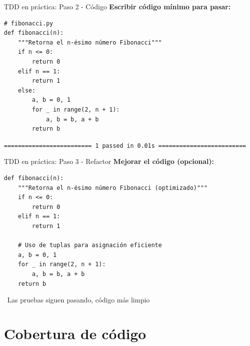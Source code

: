 \documentclass{beamer}
\begin{document}
\begin{frame}[fragile]{TDD en práctica: Paso 2 - Código \faCircle[green]}
\textbf{Escribir código mínimo para pasar:}
\begin{lstlisting}
# fibonacci.py
def fibonacci(n):
    """Retorna el n-ésimo número Fibonacci"""
    if n <= 0:
        return 0
    elif n == 1:
        return 1
    else:
        a, b = 0, 1
        for _ in range(2, n + 1):
            a, b = b, a + b
        return b
\end{lstlisting}

\vspace{-0.2cm}
\begin{tcolorbox}[colback=green!10,colframe=green,title={\small\faCheckCircle \ Resultado},coltitle=fg0,left=3pt,right=3pt,top=2pt,bottom=2pt,boxsep=1pt]
\small\texttt{========================= 1 passed in 0.01s =========================}
\end{tcolorbox}
\end{frame}

\begin{frame}[fragile]{TDD en práctica: Paso 3 - Refactor \faCircle[blue]}
\textbf{Mejorar el código (opcional):}
\begin{lstlisting}
def fibonacci(n):
    """Retorna el n-ésimo número Fibonacci (optimizado)"""
    if n <= 0:
        return 0
    elif n == 1:
        return 1
    
    # Uso de tuplas para asignación eficiente
    a, b = 0, 1
    for _ in range(2, n + 1):
        a, b = b, a + b
    return b
\end{lstlisting}

\vspace{-0.1cm}
\begin{notebox}
\small\faCheckCircle\ Las pruebas siguen pasando, código más limpio
\end{notebox}
\end{frame}

\section{Cobertura de código}
\end{document}
